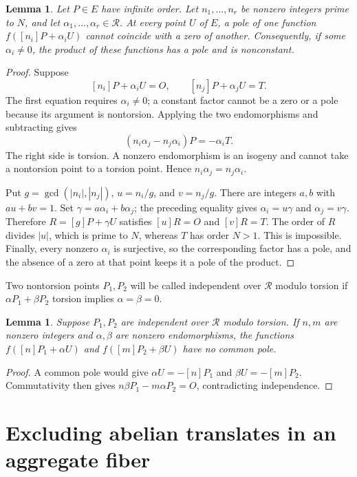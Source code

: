 \documentclass[11pt,a4paper]{article}
\newtheorem{lemma}[theorem]{Lemma}
\begin{document}
\begin{lemma}\label{lem:no-internal-cancellation}
Let $P\in E$ have infinite order. Let $n_1,\ldots,n_r$ be
nonzero integers prime to $N$, and let
$\alpha_1,\ldots,\alpha_r\in\mathcal R$. At every point $U$
of $E$, a pole of one function
$f([n_i]P+\alpha_iU)$ cannot coincide with a zero of another.
Consequently, if some $\alpha_i\ne0$, the product of these
functions has a pole and is nonconstant.
\end{lemma}
\begin{proof}
Suppose
\[
 [n_i]P+\alpha_iU=O,\qquad
 [n_j]P+\alpha_jU=T.
\]
The first equation requires $\alpha_i\ne0$; a constant factor
cannot be a zero or a pole because its argument is nontorsion.
Applying the two endomorphisms and subtracting gives
\[
 (n_i\alpha_j-n_j\alpha_i)P=-\alpha_iT.
\]
The right side is torsion. A nonzero endomorphism is an isogeny
and cannot take a nontorsion point to a torsion point. Hence
$n_i\alpha_j=n_j\alpha_i$.

Put $g=\gcd(|n_i|,|n_j|)$, $u=n_i/g$, and $v=n_j/g$.
There are integers $a,b$ with $au+bv=1$. Set
$\gamma=a\alpha_i+b\alpha_j$; the preceding equality gives
$\alpha_i=u\gamma$ and $\alpha_j=v\gamma$. Therefore
$R=[g]P+\gamma U$ satisfies $[u]R=O$ and $[v]R=T$.
The order of $R$ divides $|u|$, which is prime to $N$, whereas
$T$ has order $N>1$. This is impossible. Finally, every nonzero
$\alpha_i$ is surjective, so the corresponding factor has a
pole, and the absence of a zero at that point keeps it a pole
of the product.
\end{proof}

Two nontorsion points $P_1,P_2$ will be called independent over
$\mathcal R$ modulo torsion if
$\alpha P_1+\beta P_2$ torsion implies $\alpha=\beta=0$.

\begin{lemma}\label{lem:cross-cancellation}
Suppose $P_1,P_2$ are independent over $\mathcal R$ modulo
torsion. If $n,m$ are nonzero integers and $\alpha,\beta$ are
nonzero endomorphisms, the functions
$f([n]P_1+\alpha U)$ and $f([m]P_2+\beta U)$ have no common
pole.
\end{lemma}
\begin{proof}
A common pole would give $\alpha U=-[n]P_1$ and
$\beta U=-[m]P_2$. Commutativity then gives
$n\beta P_1-m\alpha P_2=O$, contradicting independence.
\end{proof}

\section{Excluding abelian translates in an aggregate fiber}
\end{document}
